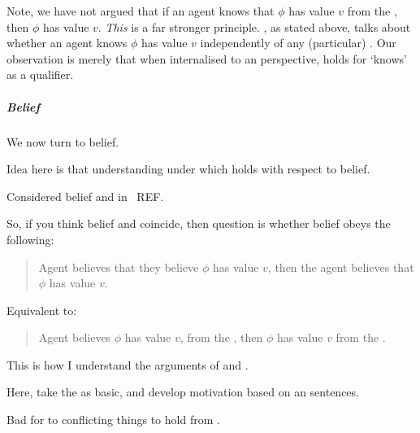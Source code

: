 \begin{note}[Caution]
  Note, we have not argued that if an agent knows that \(\phi\) has value \(v\) from the \agpe{}, then \(\phi\) has value \(v\).
  \emph{This} is a far stronger principle.
  , as stated above, talks about whether an agent knows \(\phi\) has value \(v\) independently of any (particular) \agpe{}.
  Our observation is merely that when internalised to an perspective, \ptivity{} holds for `knows' as a qualifier.
\end{note}

\subparagraph{Belief}

\begin{note}
  We now turn to belief.

  Idea here is that understanding under which \ptivity{} holds with respect to belief.
\end{note}

\begin{note}
  Considered belief and \agpe{} in~{\color{red} REF}.

  So, if you think belief and \agpe{} coincide, then question is whether belief obeys the following:
  \begin{quote}
    Agent believes that they believe \(\phi\) has value \(v\), then the agent believes that \(\phi\) has value \(v\).
  \end{quote}
  Equivalent to:
  \begin{quote}
    Agent believes \(\phi\) has value \(v\), from the \agpe{}, then \(\phi\) has value \(v\) from the \agpe{}.
  \end{quote}

  This is how I understand the arguments of \citeauthor{Dancy:2000aa} and \citeauthor{Collins:1997wn}.

  Here, take the \agpe{} as basic, and develop motivation based on \citeauthor{Moore:1993wk}an sentences.
\end{note}

\begin{note}
  Bad for to conflicting things to hold from \agpe{}.
\end{note}

